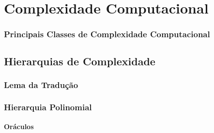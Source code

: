 \chapter{Complexidade Computacional}

\newcommand{\PhiDT}{{\mathcal{T}}} %
\newcommand{\PhiDS}{{\mathcal{S}}} %
\newcommand{\PhiNT}{{\mathcal{N\!T}}} %
\newcommand{\PhiNS}{{\mathcal{N\!S}}} %







\subsection{Principais Classes de Complexidade Computacional}
\label{classes_complexidade}

\section{Hierarquias de Complexidade}
\label{hierarquia_complexidade}

\subsection{Lema da Tradução}

\subsection{Hierarquia Polinomial}

\subsubsection{Oráculos}
